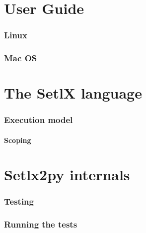 \documentclass[a4paper,11pt]{article}
\begin{document}



\tableofcontents
\listoftables
\listoffigures


\clearpage
\part{User Guide}




\section{Linux}

\section{Mac OS}

\clearpage
\part{The SetlX language}
\clearpage


\section{Execution model}
\subsection{Scoping}


\clearpage
\part{Setlx2py internals}
\clearpage



\section{Testing}

\section{Running the tests}
\end{document}
